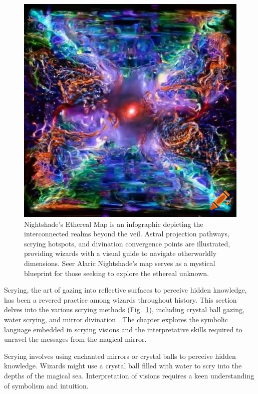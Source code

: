 \begin{figure}
    \includegraphics[width=\textwidth]{fig/img3.png}
    \caption{Nightshade's Ethereal Map \cite{nightshadeetherealmap2024} is an infographic depicting the interconnected realms beyond the veil. Astral projection pathways, scrying hotspots, and divination convergence points are illustrated, providing wizards with a visual guide to navigate otherworldly dimensions. Seer Alaric Nightshade's map serves as a mystical blueprint for those seeking to explore the ethereal unknown.}
    \label{fig:img3}
  \end{figure}

Scrying, the art of gazing into reflective surfaces to perceive hidden knowledge, has been a revered practice among wizards throughout history. This section delves into the various scrying methods (Fig.~\ref{fig:img3}), including crystal ball gazing, water scrying, and mirror divination \cite{scryingtechniques2018}. The chapter explores the symbolic language embedded in scrying visions and the interpretative skills required to unravel the messages from the magical mirror.

Scrying involves using enchanted mirrors or crystal balls to perceive hidden knowledge. Wizards might use a crystal ball filled with water to scry into the depths of the magical sea. Interpretation of visions requires a keen understanding of symbolism and intuition.

